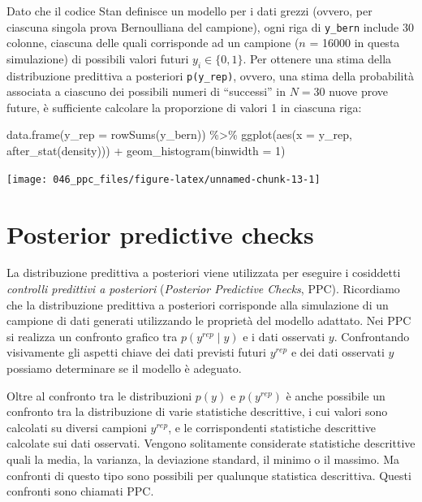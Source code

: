 \documentclass[
  10pt,
  italian,
  a4paper,
  extrafontsizes,onecolumn,openright
  ]{memoir}
\newenvironment{Shaded}{\begin{snugshade}}{\end{snugshade}}
\newcommand{\AttributeTok}[1]{\textcolor[rgb]{0.77,0.63,0.00}{#1}}
\newcommand{\DecValTok}[1]{\textcolor[rgb]{0.00,0.00,0.81}{#1}}
\newcommand{\FunctionTok}[1]{\textcolor[rgb]{0.00,0.00,0.00}{#1}}
\newcommand{\NormalTok}[1]{#1}
\newcommand{\SpecialCharTok}[1]{\textcolor[rgb]{0.00,0.00,0.00}{#1}}
\begin{document}
\noindent
Dato che il codice Stan definisce un modello per i dati grezzi (ovvero, per ciascuna singola prova Bernoulliana del campione), ogni riga di \texttt{y\_bern} include 30 colonne, ciascuna delle quali corrisponde ad un campione (\(n\) = 16000 in questa simulazione) di possibili valori futuri \(y_i \in \{0, 1\}\). Per ottenere una stima della distribuzione predittiva a posteriori \texttt{p(y\_rep)}, ovvero, una stima della probabilità associata a ciascuno dei possibili numeri di ``successi'' in \(N = 30\) nuove prove future, è sufficiente calcolare la proporzione di valori 1 in ciascuna riga:

\begin{Shaded}
\begin{Highlighting}[]
\FunctionTok{data.frame}\NormalTok{(}\AttributeTok{y\_rep =} \FunctionTok{rowSums}\NormalTok{(y\_bern)) }\SpecialCharTok{\%\textgreater{}\%}
  \FunctionTok{ggplot}\NormalTok{(}\FunctionTok{aes}\NormalTok{(}\AttributeTok{x =}\NormalTok{ y\_rep, }\FunctionTok{after\_stat}\NormalTok{(density))) }\SpecialCharTok{+}
  \FunctionTok{geom\_histogram}\NormalTok{(}\AttributeTok{binwidth =} \DecValTok{1}\NormalTok{)}
\end{Highlighting}
\end{Shaded}

\begin{center}\texttt{[image: 046\_ppc\_files/figure-latex/unnamed-chunk-13-1]} \end{center}

\hypertarget{posterior-predictive-checks}{%
\section{Posterior predictive checks}\label{posterior-predictive-checks}}

La distribuzione predittiva a posteriori viene utilizzata per eseguire i cosiddetti \emph{controlli predittivi a posteriori} (\emph{Posterior Predictive Checks}, PPC). Ricordiamo che la distribuzione predittiva a posteriori corrisponde alla simulazione di un campione di dati generati utilizzando le proprietà del modello adattato. Nei PPC si realizza un confronto grafico tra \(p(y^{rep} \mid y)\) e i dati osservati \(y\).
Confrontando visivamente gli aspetti chiave dei dati previsti futuri \(y^{rep}\) e dei dati osservati \(y\) possiamo determinare se il modello è adeguato.

Oltre al confronto tra le distribuzioni \(p(y)\) e \(p(y^{rep})\) è anche possibile un confronto tra la distribuzione di varie statistiche descrittive, i cui valori sono calcolati su diversi campioni \(y^{rep}\), e le corrispondenti statistiche descrittive calcolate sui dati osservati. Vengono solitamente considerate statistiche descrittive quali la media, la varianza, la deviazione standard, il minimo o il massimo. Ma confronti di questo tipo sono possibili per qualunque statistica descrittiva. Questi confronti sono chiamati PPC.
\end{document}
